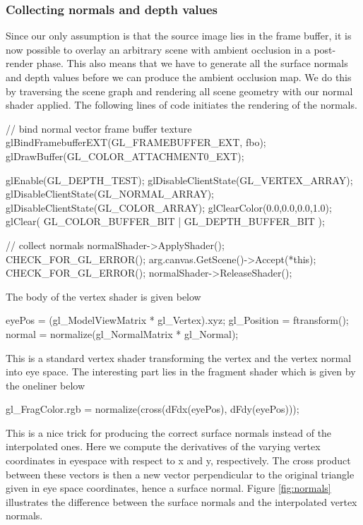 \subsubsection*{Collecting normals and depth values}  
Since our only assumption is that the source image lies in the frame
buffer, it is now possible to overlay an arbitrary scene with ambient
occlusion in a post-render phase. This also means that we have to
generate all the surface normals and depth values before we can
produce the ambient occlusion map. We do this by traversing the scene
graph and rendering all scene geometry with our normal shader
applied. The following lines of code initiates the rendering of the normals.
\begin{cppcode}
  // bind normal vector frame buffer texture
  glBindFramebufferEXT(GL_FRAMEBUFFER_EXT, fbo);
  glDrawBuffer(GL_COLOR_ATTACHMENT0_EXT);
  
  glEnable(GL_DEPTH_TEST);
  glDisableClientState(GL_VERTEX_ARRAY);
  glDisableClientState(GL_NORMAL_ARRAY);
  glDisableClientState(GL_COLOR_ARRAY);
  glClearColor(0.0,0.0,0.0,1.0);
  glClear( GL_COLOR_BUFFER_BIT | GL_DEPTH_BUFFER_BIT );
  
  // collect normals 
  normalShader->ApplyShader();
  CHECK_FOR_GL_ERROR();
  arg.canvas.GetScene()->Accept(*this);
  CHECK_FOR_GL_ERROR();
  normalShader->ReleaseShader();
\end{cppcode} 
The body of the vertex shader is given below
\begin{cppcode}
  eyePos = (gl_ModelViewMatrix * gl_Vertex).xyz;
  gl_Position = ftransform();
  normal = normalize(gl_NormalMatrix * gl_Normal);
\end{cppcode}
This is a standard vertex shader transforming the vertex and the
vertex normal into eye space. The interesting part lies in the
fragment shader which is given by the oneliner below
\begin{cppcode}
  gl_FragColor.rgb = normalize(cross(dFdx(eyePos), dFdy(eyePos)));
\end{cppcode}
This is a nice trick for producing the correct surface
normals instead of the interpolated ones. Here we compute the
derivatives of the varying vertex coordinates in eyespace
with respect to x and y, respectively. The cross product between these
vectors is then a new vector perpendicular to the original triangle
given in eye space coordinates, hence a surface normal. Figure
\ref{fig:normals} illustrates the difference between the surface
normals and the interpolated vertex normals.

